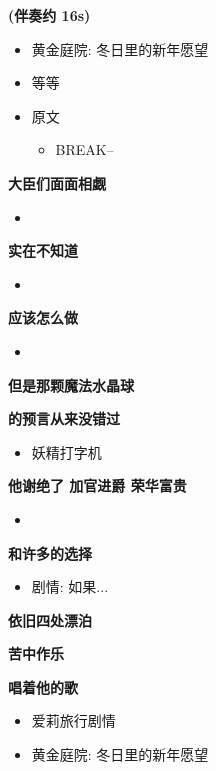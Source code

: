 \documentclass[a4paper]{article}
\begin{document}
\textbf{(伴奏约 16s)}

\begin{itemize}
    \item 黄金庭院: 冬日里的新年愿望
    \item 等等
    \item 原文
    \begin{itemize}
        \item BREAK--
    \end{itemize}
\end{itemize}

\textbf{大臣们面面相觑}

\begin{itemize}
    \item 
\end{itemize}

\textbf{实在不知道}

\begin{itemize}
    \item 
\end{itemize}

\textbf{应该怎么做}

\begin{itemize}
    \item 
\end{itemize}

\textbf{但是那颗魔法水晶球}

\textbf{的预言从来没错过}

\begin{itemize}
    \item 妖精打字机
\end{itemize}

\textbf{他谢绝了 加官进爵 荣华富贵}

\begin{itemize}
    \item 
\end{itemize}

\textbf{和许多的选择}

\begin{itemize}
    \item 剧情: 如果...
\end{itemize}

\textbf{依旧四处漂泊}

\textbf{苦中作乐}

\textbf{唱着他的歌}

\begin{itemize}
    \item 爱莉旅行剧情
    \item 黄金庭院: 冬日里的新年愿望
\end{itemize}
\end{document}
